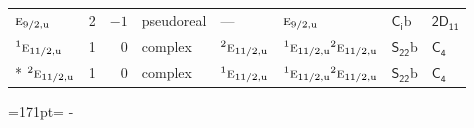 \documentclass[10pt,a4paper]{article}
\newcommand{\needspace}[1]{\par\penalty-100\begingroup\dimen0=#1\relax\dimen2=\pagegoal
  \advance\dimen2-\pagetotal\ifdim\dimen0>\dimen2\relax\ifdim\dimen2>0pt\vfil\break\fi\fi
  \endgroup}
\numberwithin{equation}{section}
\newcommand{\grp}[1]{\mathsf{#1}}
\newcommand{\irr}[1]{\text{\normalfont\scshape #1}}
\newcommand{\conjpair}[1]{{}^{#1}}
\newcommand{\ptag}[1]{\mathrm{#1}}
\newcommand{\secondclass}{\mathrm{b}}
\begin{document}
{\begin{longtable}{@{}lrrlllll@{}}
$\irr{e}_{9/2,\ptag{u}}$ & 2 & $-1$ & pseudoreal & --- & $\irr{e}_{9/2,\ptag{u}}$ & \href{S2b.pdf}{$\grp{C_{i}}\secondclass$} & \href{2D11.pdf}{$\grp{2D_{11}}$}\\
$\conjpair{1}\irr{e}_{11/2,\ptag{u}}$ & 1 & $0$ & complex & $\conjpair{2}\irr{e}_{11/2,\ptag{u}}$ & $\conjpair{1}\irr{e}_{11/2,\ptag{u}}\conjpair{2}\irr{e}_{11/2,\ptag{u}}$ & \href{S22b.pdf}{$\grp{S_{22}}\secondclass$} & \href{../../../rotation/data/pdf/C4.pdf}{$\grp{C_{4}}$}\\*
$\conjpair{2}\irr{e}_{11/2,\ptag{u}}$ & 1 & $0$ & complex & $\conjpair{1}\irr{e}_{11/2,\ptag{u}}$ & $\conjpair{1}\irr{e}_{11/2,\ptag{u}}\conjpair{2}\irr{e}_{11/2,\ptag{u}}$ & \href{S22b.pdf}{$\grp{S_{22}}\secondclass$} & \href{../../../rotation/data/pdf/C4.pdf}{$\grp{C_{4}}$}\\
\bottomrule\end{longtable}}
\needspace{171pt}
\end{document}

